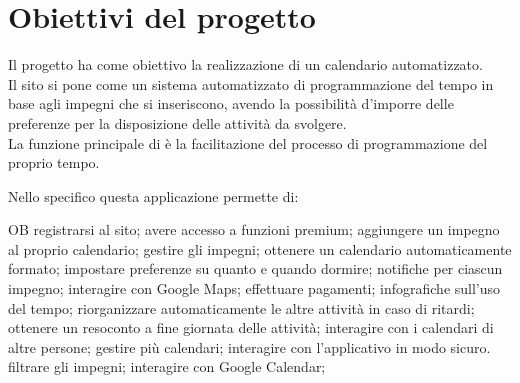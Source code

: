 \section{Obiettivi del progetto}
\label{sec:ObiettiviProgetto}
Il progetto ha come obiettivo la realizzazione di un calendario automatizzato.\\
Il sito si pone come un sistema automatizzato di programmazione del tempo in base agli impegni che si inseriscono, avendo la possibilità d'imporre delle preferenze per la disposizione delle attività da svolgere.\\
La funzione principale di \nome è la facilitazione del processo di programmazione del proprio tempo.

\vspace{0.5cm}

Nello specifico questa applicazione permette di:
\begin {mylist} {OB} 
       registrarsi al sito;
       avere accesso a funzioni premium; 
       aggiungere un impegno al proprio calendario;
       gestire gli impegni; 
       ottenere un calendario automaticamente formato; 
       impostare preferenze su quanto e quando dormire;
       notifiche per ciascun impegno; 
       interagire con Google Maps; 
       effettuare pagamenti;
       infografiche sull'uso del tempo;
       riorganizzare automaticamente le altre attività in caso di ritardi;
       ottenere un resoconto a fine giornata delle attività;
       interagire con i calendari di altre persone;
       gestire più calendari;
       interagire con l'applicativo in modo sicuro. 
       filtrare gli impegni; 
       interagire con Google Calendar;
      
\end{mylist}
